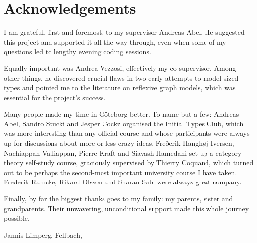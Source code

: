 \thispagestyle{plain}			%
\section*{Acknowledgements}

I am grateful, first and foremost, to my supervisor Andreas Abel. He suggested
this project and supported it all the way through, even when some of my
questions led to lengthy evening coding sessions.

Equally important was Andrea Vezzosi, effectively my co-supervisor. Among other
things, he discovered crucial flaws in two early attempts to model sized types
and pointed me to the literature on reflexive graph models, which was essential
for the project's success.

Many people made my time in Göteborg better. To name but a few: Andreas Abel,
Sandro Stucki and Jesper Cockz organised the Initial Types Club, which was more
interesting than any official course and whose participants were always up for
discussions about more or less crazy ideas. Freðerik Hanghøj Iversen, Nachiappan
Valliappan, Pierre Kraft and Siavash Hamedani set up a category theory
self-study course, graciously supervised by Thierry Coquand, which turned out to
be perhaps the second-most important university course I have taken. Frederik
Ramcke, Rikard Olsson and Sharan Sabi were always great company.

Finally, by far the biggest thanks goes to my family: my parents, sister and
grandparents. Their unwavering, unconditional support made this whole journey
possible.


\vspace{1.5cm}
\hfill
Jannis Limperg, Fellbach, \monthname \space \the\year

\newpage				%
\thispagestyle{empty}
\mbox{}
